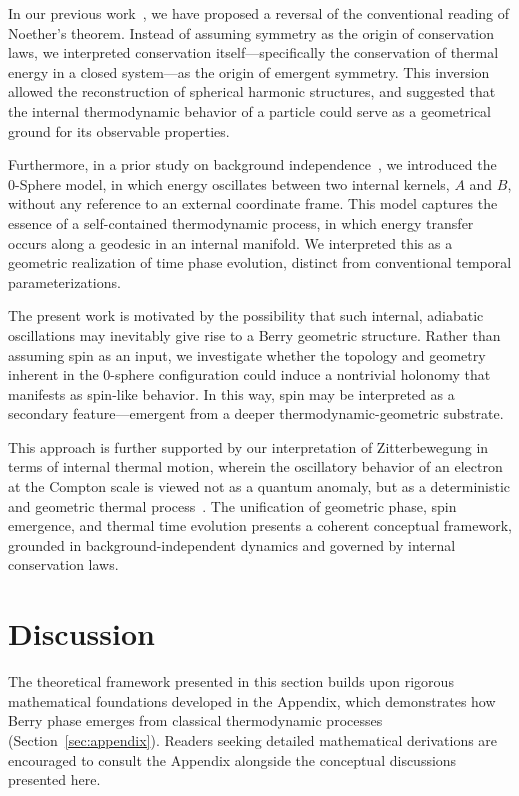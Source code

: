 \documentclass[%
 reprint,
 amsmath,amssymb,
 aps,
]{revtex4-1}
\numberwithin{equation}{section}%
\begin{document}
In our previous work~\cite{hanamura2506.0119}, we have proposed a reversal of the conventional reading of Noether's theorem. Instead of assuming symmetry as the origin of conservation laws, we interpreted conservation itself—specifically the conservation of thermal energy in a closed system—as the origin of emergent symmetry. This inversion allowed the reconstruction of spherical harmonic structures, and suggested that the internal thermodynamic behavior of a particle could serve as a geometrical ground for its observable properties.

Furthermore, in a prior study on background independence~\cite{hanamura2501.0130}, we introduced the 0-Sphere model, in which energy oscillates between two internal kernels, $A$ and $B$, without any reference to an external coordinate frame. This model captures the essence of a self-contained thermodynamic process, in which energy transfer occurs along a geodesic in an internal manifold. We interpreted this as a geometric realization of time phase evolution, distinct from conventional temporal parameterizations.

The present work is motivated by the possibility that such internal, adiabatic oscillations may inevitably give rise to a Berry geometric structure. Rather than assuming spin as an input, we investigate whether the topology and geometry inherent in the 0-sphere configuration could induce a nontrivial holonomy that manifests as spin-like behavior. In this way, spin may be interpreted as a secondary feature—emergent from a deeper thermodynamic-geometric substrate.

This approach is further supported by our interpretation of Zitterbewegung in terms of internal thermal motion, wherein the oscillatory behavior of an electron at the Compton scale is viewed not as a quantum anomaly, but as a deterministic and geometric thermal process~\cite{hanamura1811.0312}. The unification of geometric phase, spin emergence, and thermal time evolution presents a coherent conceptual framework, grounded in background-independent dynamics and governed by internal conservation laws.


\section{Discussion} \label{sec:discussion}

The theoretical framework presented in this section builds upon rigorous mathematical foundations developed in the Appendix, which demonstrates how Berry phase emerges from classical thermodynamic processes (Section~\ref{sec:appendix}). Readers seeking detailed mathematical derivations are encouraged to consult the Appendix alongside the conceptual discussions presented here.
\end{document}
